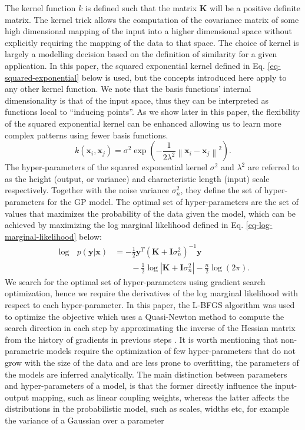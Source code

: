 \documentclass[useAMS,usenatbib,fleqn]{mn2e}
\begin{document}
The kernel function $k$ is defined such that the matrix $\mathbf{K}$ will be a positive definite matrix. The kernel trick allows the computation of the covariance matrix of some high dimensional mapping of the input into a higher dimensional space without explicitly requiring the mapping of the data to that space. The choice of kernel is largely a modelling decision based on the definition of similarity for a given application. In this paper, the squared exponential kernel defined in  Eq. \eqref{eq-squared-exponential} below is used, but the concepts introduced here apply to any other kernel function. We note that the basis functions' internal dimensionality is that of the input space, thus they can be interpreted as functions local to ``inducing points''. As we show later in this paper, the flexibility of the squared exponential kernel can be enhanced allowing us to learn more complex patterns using fewer basis functions.
\begin{equation}
\label{eq-squared-exponential}
k(\mathbf{x}_{i},\mathbf{x}_{j}) = \sigma^{2} \exp \left ( -\frac{1} {2\lambda^{2}} \left \|\mathbf{x}_{i}-\mathbf{x}_{j}\right\|^{2}\right ).
\end{equation}
The hyper-parameters of the squared exponential kernel $\sigma^{2}$ and $\lambda^{2}$ are referred to as the height (output, or variance) and characteristic length (input) scale respectively. Together with the noise variance $\sigma_{n}^{2}$, they define the set of hyper-parameters for the GP model. The optimal set of hyper-parameters are the set of values that maximizes the probability of the data given the model, which can be achieved by maximizing the log marginal likelihood defined in Eq. \eqref{eq-log-marginal-likelihood} below:
\begin{align}
\label{eq-log-marginal-likelihood}
\log\text{ }p(\mathbf{y}|\mathbf{x}) &= -\frac{1}{2}\mathbf{y}^{T}\left(\mathbf{K}+\mathbf{I}\sigma_{n}^{2} \right)^{-1}\mathbf{y} \nonumber \\
&\qquad -\frac{1}{2} \log\left | \mathbf{K}+\mathbf{I}\sigma_{n}^{2}\right|-\frac{n}{2}\log(2\pi).
\end{align}
We search for the optimal set of hyper-parameters using gradient search optimization, hence we require the derivatives of the log marginal likelihood with respect to each hyper-parameter. In this paper, the L-BFGS algorithm was used to optimize the objective which uses a Quasi-Newton method to compute the search direction in each step by approximating the inverse of the Hessian matrix from the history of gradients in previous steps \citep{jorge1980,schmidt2005}. It is worth mentioning that non-parametric models require the optimization of few hyper-parameters that do not grow with the size of the data and are less prone to overfitting, the parameters of the models are inferred analytically. The main distinction between parameters and hyper-parameters of a model, is that the former directly influence the input-output mapping, such as linear coupling weights, whereas the latter affects the distributions in the probabilistic model, such as scales, widths etc, for example the variance of a Gaussian over a parameter
\end{document}
